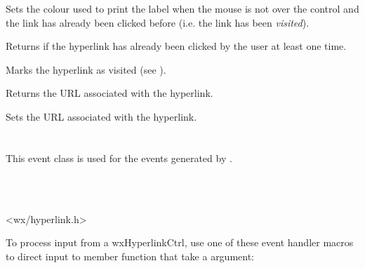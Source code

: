 Sets the colour used to print the label when the mouse is not over the control
and the link has already been clicked before (i.e. the link has been {\it visited}).


\label{wxhyperlinkctrlgetvisited}


Returns \true if the hyperlink has already been clicked by the user at least one time.


\label{wxhyperlinkctrlsetvisited}


Marks the hyperlink as visited (see ).


\label{wxhyperlinkctrlgeturl}


Returns the URL associated with the hyperlink.


\label{wxhyperlinkctrlseturl}


Sets the URL associated with the hyperlink.






\section{}\label{wxhyperlinkevent}

This event class is used for the events generated by
.


\\
\\


<wx/hyperlink.h>


To process input from a wxHyperlinkCtrl, use one of these event handler macros to
direct input to member function that take a
 argument:

